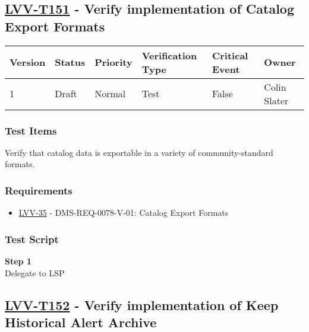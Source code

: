 \hypertarget{lvv-t151---verify-implementation-of-catalog-export-formats}{\subsection{\texorpdfstring{\href{https://jira.lsstcorp.org/secure/Tests.jspa\#/testCase/LVV-T151}{LVV-T151}
- Verify implementation of Catalog Export
Formats}{LVV-T151 - Verify implementation of Catalog Export Formats}}\label{lvv-t151---verify-implementation-of-catalog-export-formats}}

\begin{longtable}[]{@{}llllll@{}}
\toprule
Version & Status & Priority & Verification Type & Critical Event &
Owner\tabularnewline
\midrule
\endhead
1 & Draft & Normal & Test & False & Colin Slater\tabularnewline
\bottomrule
\end{longtable}

\subsubsection{Test Items}\label{test-items-20}

Verify that catalog data is exportable in a variety of
community-standard formats.

\subsubsection{Requirements}\label{requirements-20}

\begin{itemize}
\tightlist
\item
  \href{https://jira.lsstcorp.org/browse/LVV-35}{LVV-35} -
  DMS-REQ-0078-V-01: Catalog Export Formats
\end{itemize}

\subsubsection{Test Script}\label{test-script-20}

\textbf{Step 1}\\
Delegate to LSP\\[2\baselineskip]

\hypertarget{lvv-t152---verify-implementation-of-keep-historical-alert-archive}{\subsection{\texorpdfstring{\href{https://jira.lsstcorp.org/secure/Tests.jspa\#/testCase/LVV-T152}{LVV-T152}
- Verify implementation of Keep Historical Alert
Archive}{LVV-T152 - Verify implementation of Keep Historical Alert Archive}}\label{lvv-t152---verify-implementation-of-keep-historical-alert-archive}}

